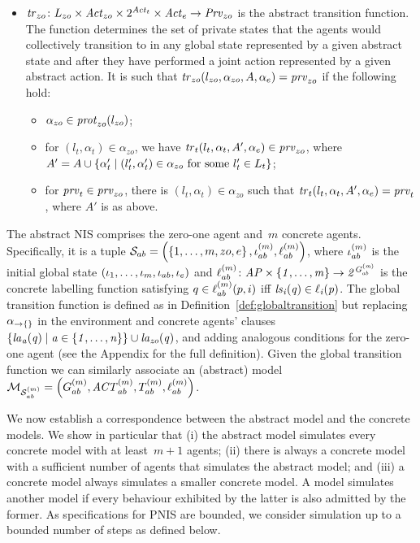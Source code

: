 \begin{definition}
\begin{itemize}[$\bullet$]
    \item $\mathit{tr}_{zo} \colon L_{zo} \times \mathit{Act}_{zo} \times 2^{\mathit{Act}_{t}} 
    \times \mathit{Act}_{e} \rightarrow \mathit{Prv}_{zo}$ is the abstract transition function.
    The function determines the set of private states that the agents would
    collectively transition to in any global state represented by a given
    abstract state and after they have performed a joint action represented by a
    given abstract action. It is such that $\mathit{tr}_{zo}(l_{zo}, \alpha_{zo}, A, \alpha_e)
    = \mathit{prv}_{zo}$ if the following hold:
    \begin{itemize}[\textbf{--}]
    \item $\alpha_{zo} \in \mathit{prot}_{zo}(l_{zo})$; 
    \item for $(l_t, \alpha_t) \in \alpha_{zo}$, we have
      $\mathit{tr}_{t}(l_t, \alpha_t, A', \alpha_e) \in \mathit{prv}_{zo}$, where
      $A' = A \cup \left \{ \alpha'_t \mid (l'_t, \alpha'_t) \in \alpha_{zo} \text{
          for some } l'_t \in L_{t} \right \}$;
    \item for $\mathit{prv}_{t} \in \mathit{prv}_{zo}$, there is
      $(l_t, \alpha_t) \in \alpha_{zo}$ such that
      $\mathit{tr}_{t}(l_t, \alpha_t, A', \alpha_e) = \mathit{prv}_{t}$, where $A'$ is as above.
    \end{itemize}
\end{itemize}
\end{definition}

The abstract  NIS comprises the zero-one agent and~$m$ concrete agents. Specifically, it is a
tuple $\mathcal S_{ab} = \left ( \left \{ 1,\ldots,m,zo,e \right \}, \iota^{({m})}_{ab},
\ell^{(m)}_{ab} \right )$, where $\iota^{({m})}_{ab}$ is the initial global state $\left ( \iota_{1}, \ldots, \iota_{m}, \iota_{ab}, \iota_{e} \right )$  and $\ell^{(m)}_{ab} \colon
\it{AP} \times \left \{ 1, \ldots, m  \right \} \rightarrow 2^{G^{(m)}_{ab}}$ is the
concrete labelling function satisfying $q \in \ell^{(m)}_{ab}(p,i)$ iff
$\it{ls}_{i}(q) \in \ell_{i}(p)$.  The global transition function is defined as in
Definition~\ref{def:globaltransition} but replacing $\alpha_{\rightarrow\{\}}$ in
the environment and concrete agents' clauses $\left \{ \it{la}_{a}({q}) \mid a \in
\left \{ 1,\ldots,n \right \} \right \} \cup \it{la}_{zo}({q})$,  and adding analogous conditions for the
zero-one agent (see the Appendix for the full definition). Given the global
transition function we can similarly associate an (abstract) model  $\mathcal{M}_{\mathcal{S}_{ab}^{(m)}} =
\left ( G^{(m)}_{ab}, \mathit{ACT}^{(m)}_{ab}, T^{(m)}_{ab}, \ell^{(m)}_{ab} \right )$.

We now establish a correspondence between the abstract model and the concrete
models. We show in particular that (i) the abstract model simulates every
concrete model with at least~$m+1$ agents; (ii) there is always a concrete model
with a sufficient number of agents that simulates the abstract model; and (iii)
a concrete model always simulates a smaller concrete model. A model simulates another
model if every behaviour exhibited by the latter is also admitted by the former.
As specifications for PNIS are bounded, we consider simulation up to a bounded
number of steps as defined below.

